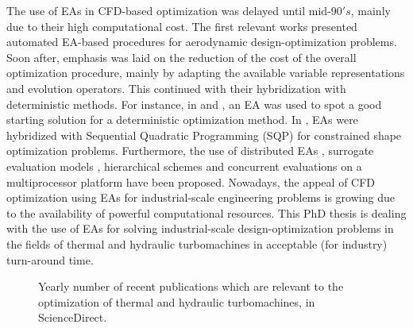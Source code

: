 The use of EAs in CFD-based optimization was delayed until mid-$90's$, mainly due to their high computational cost. The first relevant works \cite{kn:Quag95,per:95,kn:Gala96} presented automated EA-based procedures for aerodynamic design-optimization problems. Soon after, emphasis was laid on the reduction of the cost of the overall optimization procedure, mainly by adapting the available variable representations and evolution operators. This continued with their hybridization with deterministic methods. For instance, in \cite{kn:Mar97} and \cite{kn:Fost97}, an EA was used to spot a good starting solution for a deterministic optimization method. In \cite{dennis:99}, EAs were hybridized with Sequential Quadratic Programming (SQP) for constrained shape optimization problems. Furthermore,  the use of distributed EAs \cite{kn:Door1997,kn:SefrThes}, surrogate evaluation models \cite{kn:Ratl98,kn:Gio99,kn:Gian1999,EBNK,phd_Kampolis}, hierarchical schemes \cite{kn:Eby1998,kn:Sef2000,knowles00mpaes_x41,Desid2003,phd_Kampolis} and concurrent evaluations on a multiprocessor platform \cite{kn:LeeH96,phd_Giotis,phd_Vera} have been proposed. Nowadays, the appeal of CFD optimization using EAs for industrial-scale engineering problems is growing due to the availability of powerful computational resources. This PhD thesis is dealing with the use of EAs for solving industrial-scale design-optimization problems in the fields of thermal and hydraulic turbomachines in acceptable (for industry) turn-around time.   


\begin{figure}[h!]
\begin{minipage}[b]{1\linewidth}
 \centering
\end{minipage}
\caption{Yearly number of recent publications which are relevant to the optimization of thermal and hydraulic turbomachines, in ScienceDirect.} 
\label{pubs.turbo}
\end{figure}
 

